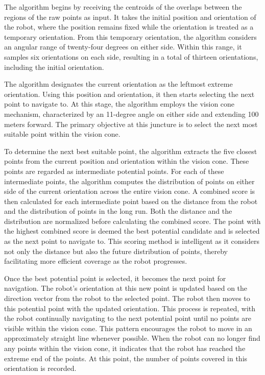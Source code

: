     


\vspace*{6mm}  
 
The algorithm begins by receiving the centroids of the overlaps between the regions of the raw points as input. It takes the initial position and orientation of the robot, where the position remains fixed while the orientation is treated as a temporary orientation. From this temporary orientation, the algorithm considers an angular range of twenty-four degrees on either side. Within this range, it samples six orientations on each side, resulting in a total of thirteen orientations, including the initial orientation.

\vspace*{6mm}  

The algorithm designates the current orientation as the leftmost extreme orientation. Using this position and orientation, it then starts selecting the next point to navigate to. At this stage, the algorithm employs the vision cone mechanism, characterized by an 11-degree angle on either side and extending 100 meters forward. The primary objective at this juncture is to select the next most suitable point within the vision cone.

\vspace*{6mm}  

To determine the next best suitable point, the algorithm extracts the five closest points from the current position and orientation within the vision cone. These points are regarded as intermediate potential points. For each of these intermediate points, the algorithm computes the distribution of points on either side of the current orientation across the entire vision cone. A combined score is then calculated for each intermediate point based on the distance from the robot and the distribution of points in the long run. Both the distance and the distribution are normalized before calculating the combined score. The point with the highest combined score is deemed the best potential candidate and is selected as the next point to navigate to. This scoring method is intelligent as it considers not only the distance but also the future distribution of points, thereby facilitating more efficient coverage as the robot progresses.

\vspace*{6mm}  

Once the best potential point is selected, it becomes the next point for navigation. The robot's orientation at this new point is updated based on the direction vector from the robot to the selected point. The robot then moves to this potential point with the updated orientation. This process is repeated, with the robot continually navigating to the next potential point until no points are visible within the vision cone. This pattern encourages the robot to move in an approximately straight line whenever possible. When the robot can no longer find any points within the vision cone, it indicates that the robot has reached the extreme end of the points. At this point, the number of points covered in this orientation is recorded.


